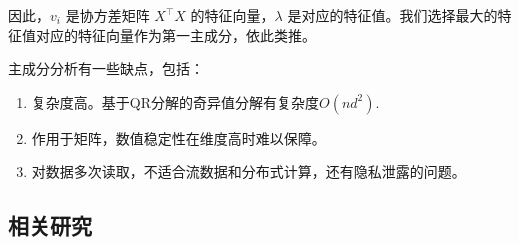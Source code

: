 \documentclass[lang=cn,newtx,10pt,scheme=chinese,chinesefont=nofont,citestyle=gb7714-2015, bibstyle=gb7714-2015]{elegantbook}
\begin{document}
\begin{refsection}
因此，$v_i$ 是协方差矩阵 $X^\top X$ 的特征向量，$\lambda$ 是对应的特征值。我们选择最大的特征值对应的特征向量作为第一主成分，依此类推。







主成分分析有一些缺点，包括：
\begin{enumerate}
    \item 复杂度高。基于QR分解的奇异值分解有复杂度$O(nd^2)$.
    \item 作用于矩阵，数值稳定性在维度高时难以保障。
    \item 对数据多次读取，不适合流数据和分布式计算，还有隐私泄露的问题。
\end{enumerate}

\subsection{相关研究}

\end{refsection}
\end{document}
